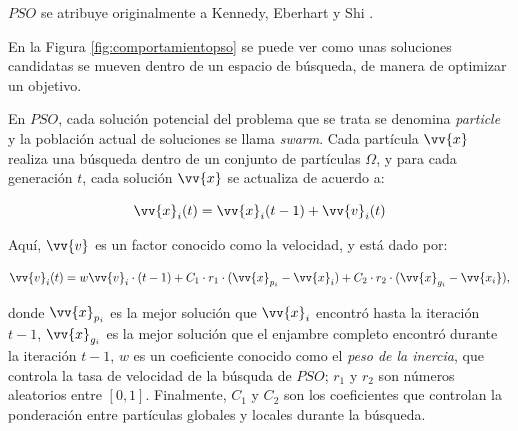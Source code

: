 $PSO$ se atribuye originalmente a Kennedy, Eberhart y Shi \cite{699146}.

En la Figura \ref{fig:comportamientopso} se puede ver como unas soluciones candidatas se mueven dentro de un espacio de búsqueda, de manera de optimizar un objetivo.

En $PSO$, cada solución potencial del problema que se trata se denomina \textit{particle} y la población actual de soluciones se llama \textit{swarm}. Cada partícula $\vv{x}$\label{symbol:mopsoparticula} realiza una búsqueda dentro de un conjunto de partículas $\Omega$, y para cada generación $t$, cada solución $\vv{x}$ se actualiza de acuerdo a: 


\begin{equation}\label{eq:posicion1}
\vv{x}_i(t) = \vv{x}_i(t-1) + \vv{v}_i(t)
\end{equation}



Aquí, $\vv{v}$\label{symbol:mopsovelocidad} es un factor conocido como la velocidad, y está dado por:

\begin{equation}\label{eq:velocidad1}
\vv{v}_i(t) = w \vv{v}_i\cdot (t-1) + C_1 \cdot r_1 \cdot (\vv{x}_{p_i} - \vv{x}_i) + C_2 \cdot r_2 \cdot (\vv{x}_{g_i} - \vv{x_i}) \text{,}
\end{equation}

donde $\vv{x}_{p_i}$ es la mejor solución que $\vv{x}_i$ encontró hasta la iteración $t-1$, $\vv{x}_{g_i}$ es la mejor solución que el enjambre completo encontró durante la iteración $t-1$, $w$ es un coeficiente conocido como el \textit{peso de la inercia}, que controla la tasa de velocidad de la búsquda de $PSO$; $r_1$ y $r_2$ son números aleatorios entre $[0,1]$. Finalmente, $C_1$ y $C_2$ son los coeficientes que controlan la ponderación entre partículas globales y locales durante la búsqueda.


